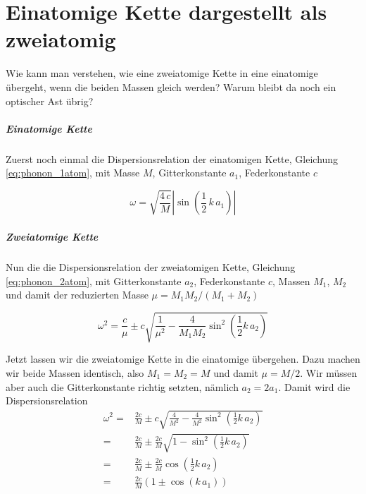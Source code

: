 


\chapter{Einatomige Kette dargestellt als zweiatomig}


Wie kann man verstehen, wie eine zweiatomige Kette in eine einatomige übergeht, wenn die beiden Massen gleich werden? Warum bleibt da noch ein optischer Ast übrig?

\paragraph{Einatomige  Kette} Zuerst noch einmal die Dispersionsrelation der einatomigen Kette, Gleichung \ref{eq:phonon_1atom}, mit
Masse $M$, Gitterkonstante $a_1$, Federkonstante $c$


\begin{equation}
\omega = \sqrt{\frac{4 \, c}{M}} \left| \sin \left(\frac{1}{2} \,  k \, a_1  \right) \right|
\end{equation}




\paragraph{Zweiatomige  Kette}  Nun die die Dispersionsrelation der zweiatomigen Kette, Gleichung \ref{eq:phonon_2atom}, mit
Gitterkonstante $a_2$, Federkonstante $c$, Massen $M_1$, $M_2$ und damit der reduzierten Masse $\mu = M_1 M_2 / (M_1 + M_2)$

\begin{equation}
\omega^2 =  \frac{c}{\mu}
\pm c \sqrt{ \frac{1}{\mu^2} - \frac{4}{M_1 M_2}  \sin^2 \left( \frac{1}{2}  k \, a_2 \right) } 
\end{equation}

Jetzt lassen wir die zweiatomige Kette in die einatomige übergehen. Dazu machen wir beide Massen  identisch, also $M_1 = M_2 = M$ und damit $\mu = M/2$. Wir müssen aber auch die Gitterkonstante richtig setzten, nämlich $a_2 = 2 a_1$. Damit wird die Dispersionsrelation
\begin{align}
\omega^2 =  & \frac{2c}{M}
\pm c \sqrt{ \frac{4}{M^2} - \frac{4}{M^2}  \sin^2 \left( \frac{1}{2}  k \, a_2 \right) }  \\
= &\frac{2c}{M}
\pm \frac{2c}{M} \sqrt{ 1 -   \sin^2 \left( \frac{1}{2}  k \, a_2 \right) }  \\
= &\frac{2c}{M}
\pm \frac{2c}{M}   \cos \left( \frac{1}{2}  k \, a_2 \right)   \\
= &\frac{2c}{M} \left( 1 
\pm   \cos \left(   k \, a_1 \right)    \right)
\end{align}

